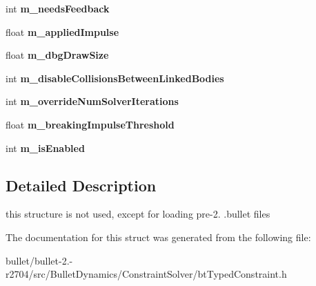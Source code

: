 \begin{DoxyCompactItemize}
\item 
\hypertarget{structbt_typed_constraint_data_a32362fd496f74fc2f6b491359a061e0b}{int {\bfseries m\+\_\+needs\+Feedback}}\label{structbt_typed_constraint_data_a32362fd496f74fc2f6b491359a061e0b}

\item 
\hypertarget{structbt_typed_constraint_data_aaad95a1f6b92cea9ef6385164ba1d759}{float {\bfseries m\+\_\+applied\+Impulse}}\label{structbt_typed_constraint_data_aaad95a1f6b92cea9ef6385164ba1d759}

\item 
\hypertarget{structbt_typed_constraint_data_aaf0585171dc0c88b1af69235264c4f73}{float {\bfseries m\+\_\+dbg\+Draw\+Size}}\label{structbt_typed_constraint_data_aaf0585171dc0c88b1af69235264c4f73}

\item 
\hypertarget{structbt_typed_constraint_data_a28284874673a2169d0d18ea1da9d3a1e}{int {\bfseries m\+\_\+disable\+Collisions\+Between\+Linked\+Bodies}}\label{structbt_typed_constraint_data_a28284874673a2169d0d18ea1da9d3a1e}

\item 
\hypertarget{structbt_typed_constraint_data_aa005bfa911ec8d84d61497edc15b8be4}{int {\bfseries m\+\_\+override\+Num\+Solver\+Iterations}}\label{structbt_typed_constraint_data_aa005bfa911ec8d84d61497edc15b8be4}

\item 
\hypertarget{structbt_typed_constraint_data_a6110022d869c9d7650a11805a2357091}{float {\bfseries m\+\_\+breaking\+Impulse\+Threshold}}\label{structbt_typed_constraint_data_a6110022d869c9d7650a11805a2357091}

\item 
\hypertarget{structbt_typed_constraint_data_a100659d6659c30e52820f7954e605881}{int {\bfseries m\+\_\+is\+Enabled}}\label{structbt_typed_constraint_data_a100659d6659c30e52820f7954e605881}

\end{DoxyCompactItemize}


\subsection{Detailed Description}
this structure is not used, except for loading pre-\/2. .bullet files 

The documentation for this struct was generated from the following file\+:\begin{DoxyCompactItemize}
\item 
bullet/bullet-\/2.-\/r2704/src/\+Bullet\+Dynamics/\+Constraint\+Solver/bt\+Typed\+Constraint.\+h\end{DoxyCompactItemize}

